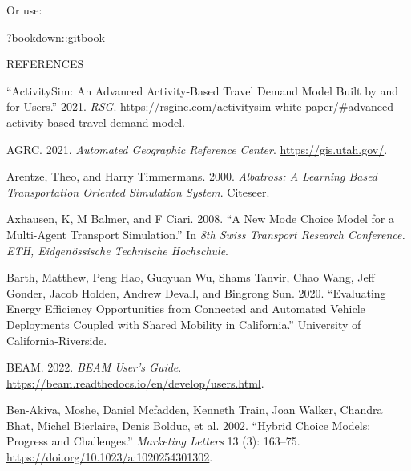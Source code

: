\documentclass[12pt, oneside, openright]{byuthesis}
\newlength{\cslhangindent}
\newlength{\cslentryspacingunit} %
\newenvironment{CSLReferences}[2] %
 {%
  \setlength{\parindent}{0pt}
  \ifodd #1
  \let\oldpar\par
  \def\par{\hangindent=\cslhangindent\oldpar}
  \fi
  \setlength{\parskip}{#2\cslentryspacingunit}
 }%
 {}
\newenvironment{Shaded}{\begin{snugshade}}{\end{snugshade}}
\newcommand{\NormalTok}[1]{#1}
\newcommand{\SpecialCharTok}[1]{\textcolor[rgb]{0.00,0.00,0.00}{#1}}
\begin{document}
Or use:

\begin{Shaded}
\begin{Highlighting}[]
\NormalTok{?bookdown}\SpecialCharTok{::}\NormalTok{gitbook}
\end{Highlighting}
\end{Shaded}

\cleardoublepage
    \begin{centering}
    REFERENCES\\
     \baselineskip
    \end{centering}

\hypertarget{refs}{}
\begin{CSLReferences}{1}{0}
\leavevmode{}%
{``ActivitySim: An Advanced Activity-Based Travel Demand Model Built by and for Users.''} 2021. \emph{RSG}. \url{https://rsginc.com/activitysim-white-paper/\#advanced-activity-based-travel-demand-model}.

\leavevmode{}%
AGRC. 2021. \emph{Automated Geographic Reference Center}. \url{https://gis.utah.gov/}.

\leavevmode{}%
Arentze, Theo, and Harry Timmermans. 2000. \emph{Albatross: A Learning Based Transportation Oriented Simulation System}. Citeseer.

\leavevmode{}%
Axhausen, K, M Balmer, and F Ciari. 2008. {``A New Mode Choice Model for a Multi-Agent Transport Simulation.''} In \emph{8th Swiss Transport Research Conference. ETH, Eidgen{ö}ssische Technische Hochschule}.

\leavevmode{}%
Barth, Matthew, Peng Hao, Guoyuan Wu, Shams Tanvir, Chao Wang, Jeff Gonder, Jacob Holden, Andrew Devall, and Bingrong Sun. 2020. {``Evaluating Energy Efficiency Opportunities from Connected and Automated Vehicle Deployments Coupled with Shared Mobility in California.''} University of California-Riverside.

\leavevmode{}%
BEAM. 2022. \emph{BEAM User's Guide}. \url{https://beam.readthedocs.io/en/develop/users.html}.

\leavevmode{}%
Ben-Akiva, Moshe, Daniel Mcfadden, Kenneth Train, Joan Walker, Chandra Bhat, Michel Bierlaire, Denis Bolduc, et al. 2002. {``Hybrid Choice Models: Progress and Challenges.''} \emph{Marketing Letters} 13 (3): 163--75. \url{https://doi.org/10.1023/a:1020254301302}.


\end{CSLReferences}
\end{document}
